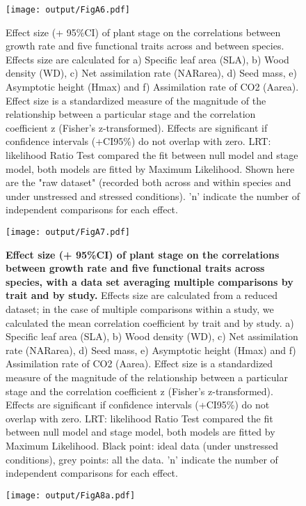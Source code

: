 \documentclass[a4paper]{article}\usepackage[]{graphicx}\usepackage[]{color}
\begin{document}
\begin{appendices}
\begin{figure}[htbp]
\centering
\texttt{[image: output/FigA6.pdf]}
\caption{Effect size (+ 95\%CI) of plant stage on the correlations between growth rate and five functional traits across and between species. Effects size are calculated for a) Specific leaf area (SLA), b) Wood density (WD), c) Net assimilation rate (NARarea), d) Seed mass, e) Asymptotic height (Hmax) and f) Assimilation rate of CO2 (Aarea). Effect size is a standardized measure of the magnitude of the relationship between a particular stage and the correlation coefficient z (Fisher's z-transformed). Effects are significant if confidence intervals (+CI95\%) do not overlap with zero. LRT: likelihood Ratio Test compared the fit between null model and stage model, both models are fitted by Maximum Likelihood. Shown here are the "raw dataset" (recorded both across and within species and under unstressed and stressed conditions). 'n' indicate the number of independent comparisons for each effect.
}
\label{FigA6}
\end{figure}


\begin{figure}[htbp]
\centering
\texttt{[image: output/FigA7.pdf]}
\caption{\textbf{Effect size (+ 95\%CI) of plant stage on the correlations between growth rate and five functional traits across species, with a data set averaging multiple comparisons by trait and by study.} Effects size are calculated from a reduced dataset; in the case of multiple comparisons within a study, we calculated the mean correlation coefficient by trait and by study. a) Specific leaf area (SLA), b) Wood density (WD), c) Net assimilation rate (NARarea), d) Seed mass, e) Asymptotic height (Hmax) and f) Assimilation rate of CO2 (Aarea). Effect size is a standardized measure of the magnitude of the relationship between a particular stage and the correlation coefficient z (Fisher's z-transformed). Effects are significant if confidence intervals (+CI95\%) do not overlap with zero. LRT: likelihood Ratio Test compared the fit between null model and stage model, both models are fitted by Maximum Likelihood. Black point: ideal data (under unstressed conditions), grey points: all the data. 'n' indicate the number of independent comparisons for each effect.}
\label{FigA7}
\end{figure}



\begin{figure}[htbp]
\centering
\texttt{[image: output/FigA8a.pdf]}
\end{figure}


\end{appendices}
\end{document}
